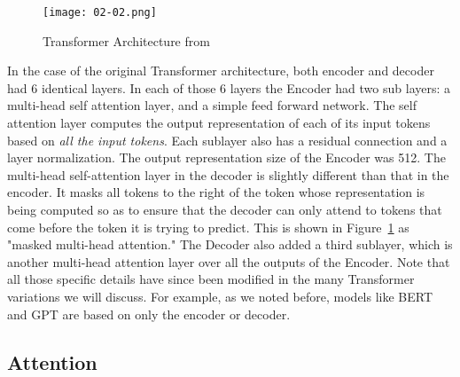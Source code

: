 \documentclass{article}
\begin{document}
\begin{figure}
    \centering
    \texttt{[image: 02-02.png]}
    \caption{Transformer Architecture from {\protect{}}}
    \label{fig:transformer}
\end{figure}

In the case of the original Transformer architecture, both encoder and decoder had 6 identical layers. In each of those 6 layers the 
Encoder had two sub layers: a multi-head self attention layer, and a simple feed forward network. The self attention layer computes the output representation of each of its input tokens based on {\em all the input tokens}. Each sublayer also has a residual connection and a layer normalization. The output representation size of the Encoder was 512. The multi-head self-attention layer in the decoder is slightly different than that in the encoder. It masks all tokens to the right of the token whose representation is being computed so as to ensure that the decoder can only attend to tokens that come before the token it is trying to predict. This is shown in Figure~\ref{fig:transformer} as "masked multi-head attention." The Decoder also added a third sublayer, which is another multi-head attention layer over all the outputs of the Encoder. Note that all those specific details have since been modified in the many Transformer variations we will discuss. For example, as we noted before, models like BERT and GPT are based on only the encoder or decoder.

\subsection{Attention}
\end{document}
